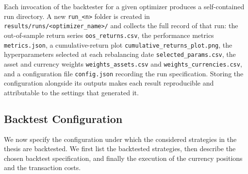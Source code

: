 Each invocation of the backtester for a given optimizer produces a self-contained
run directory. A new \texttt{run\_<n>} folder is created in
\texttt{results/runs/<optimizer\_name>/} and collects the full record of that run: the
out-of-sample return series \texttt{oos\_returns.csv}, the performance
metrics \texttt{metrics.json}, a cumulative-return plot
\texttt{cumulative\_returns\_plot.png}, the hyperparameters selected at each rebalancing date
\texttt{selected\_params.csv}, the asset and currency weights \texttt{weights\_assets.csv} and
\texttt{weights\_currencies.csv}, and a configuration file \texttt{config.json}
recording the run specification. Storing the configuration alongside its outputs
makes each result reproducible and attributable to the settings
that generated it.



\subsection{Backtest Configuration}
\label{sec:backtest-configuration}

We now specify the configuration under which the considered strategies in the thesis
are backtested. We first list the backtested strategies, then describe the chosen backtest specification, and finally the execution
of the currency positions and the transaction costs.
 

